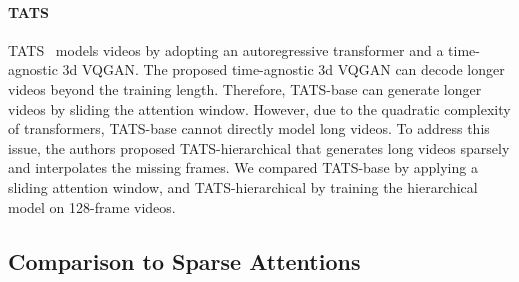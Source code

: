 \documentclass[10pt,twocolumn,letterpaper]{article}
\begin{document}
\paragraph{TATS}
TATS~\cite{TATS} models videos by adopting an autoregressive transformer and a time-agnostic 3d VQGAN. The proposed time-agnostic 3d VQGAN can decode longer videos beyond the training length. Therefore, TATS-base can generate longer videos by sliding the attention window. However, due to the quadratic complexity of transformers, TATS-base cannot directly model long videos. To address this issue, the authors proposed TATS-hierarchical that generates long videos sparsely and interpolates the missing frames. We compared TATS-base by applying a sliding attention window, and TATS-hierarchical by training the hierarchical model on 128-frame videos.

\subsection{Comparison to Sparse Attentions}
\label{appx:asymptotic_mem}
\iffalse
To compare the asymptotic memory complexity of sparse attention methods used in Section {\color{red}5.4} with MeBT, let's denote $N(=H\times W)$ and $T$ as the number of tokens in spatial and temporal dimensions, respectively. Then,
\begin{enumerate}
    \item {\bf Axial attention}~\cite{Ho2019} alternates attention over horizontal, vertical, and temporal axes. 
    The queries in each attention layer can only interact with tokens on the same axis. 
    The overall complexity is $O(NT(H+W+T))$.
    \item {\bf Window attention}~\cite{MaskViT} alternates attention over spatial and temporal axes. It performs frame-wise attention over $N$ tokens followed by spatio-temporal attention over $n\times T$ tokens where $n(=16)$ is the size of spatial window. 
    The complexity is $O(N^2T+nNT^2)$.
\end{enumerate}
While these methods are asymptotically more efficient than dense attention of $O(N^2T^2)$, they still have quadratic complexity with respect to the spatial ($N$) or temporal dimension ($T$). It is important to note that MeBT with $n$ latent codes has a linear complexity of $O(nNT)$ for both $N$ and $T$.
\fi
\end{document}

